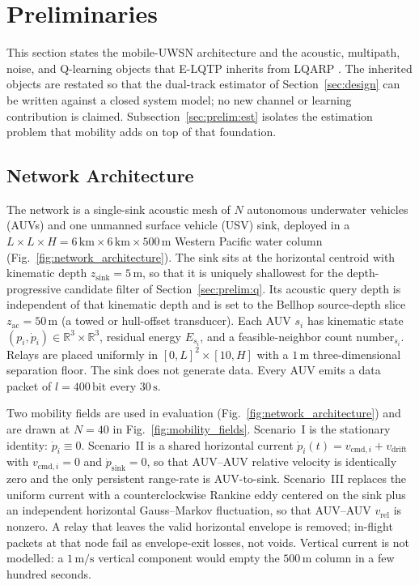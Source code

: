 \section{Preliminaries}
\label{sec:prelim}

This section states the mobile-UWSN architecture and the acoustic,
multipath, noise, and Q-learning objects that E-LQTP inherits from
LQARP \cite{liu2026lqarp}.
The inherited objects are restated so that the dual-track estimator
of Section~\ref{sec:design} can be written against a closed system
model; no new channel or learning contribution is claimed.
Subsection~\ref{sec:prelim:est} isolates the estimation problem that
mobility adds on top of that foundation.

\subsection{Network Architecture}
\label{sec:prelim:arch}

The network is a single-sink acoustic mesh of $N$ autonomous
underwater vehicles (AUVs) and one unmanned surface vehicle (USV)
sink, deployed in a
$L\times L\times H=6\,\mathrm{km}\times 6\,\mathrm{km}\times
500\,\mathrm{m}$ Western Pacific water column
(Fig.~\ref{fig:network_architecture}).
The sink sits at the horizontal centroid with kinematic depth
$z_{\mathrm{sink}}=5\,\mathrm{m}$, so that it is uniquely shallowest
for the depth-progressive candidate filter of
Section~\ref{sec:prelim:q}.
Its acoustic query depth is independent of that kinematic depth and
is set to the Bellhop source-depth slice $z_{\mathrm{ac}}=50\,\mathrm{m}$
(a towed or hull-offset transducer).
Each AUV $s_i$ has kinematic state
$(p_i,\dot{p}_i)\in\mathbb{R}^3\times\mathbb{R}^3$, residual energy
$E_{s_i}$, and a feasible-neighbor count $\mathrm{number}_{s_i}$.
Relays are placed uniformly in
$[0,L]^2\times[10,H]$ with a $1\,\mathrm{m}$ three-dimensional
separation floor.
The sink does not generate data.
Every AUV emits a data packet of $l=400\,\mathrm{bit}$ every
$30\,\mathrm{s}$.

Two mobility fields are used in evaluation
(Fig.~\ref{fig:network_architecture}) and are drawn at $N=40$ in
Fig.~\ref{fig:mobility_fields}.
Scenario~I is the stationary identity:
$\dot{p}_i\equiv 0$.
Scenario~II is a shared horizontal current
$\dot{p}_i(t)=v_{\mathrm{cmd},i}+v_{\mathrm{drift}}$ with
$v_{\mathrm{cmd},i}=0$ and $\dot{p}_{\mathrm{sink}}=0$, so that
AUV--AUV relative velocity is identically zero and the only
persistent range-rate is AUV-to-sink.
Scenario~III replaces the uniform current with a counterclockwise
Rankine eddy centered on the sink plus an independent horizontal
Gauss--Markov fluctuation, so that AUV--AUV $v_{\mathrm{rel}}$ is
nonzero.
A relay that leaves the valid horizontal envelope is removed;
in-flight packets at that node fail as envelope-exit losses, not voids.
Vertical current is not modelled: a $1\,\mathrm{m/s}$ vertical
component would empty the $500\,\mathrm{m}$ column in a few hundred
seconds.

